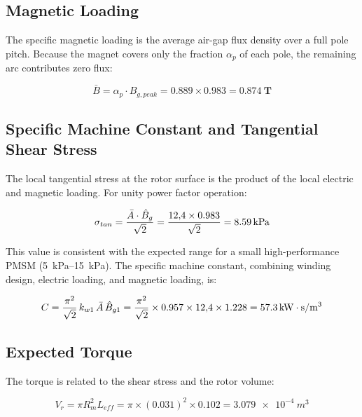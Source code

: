 \documentclass[12pt, a4paper]{article}
\begin{document}
\subsection{Magnetic Loading}

The specific magnetic loading is the average air-gap flux density over a
full pole pitch. Because the magnet covers only the fraction $\alpha_p$
of each pole, the remaining arc contributes zero flux:

\begin{equation}
    \bar{B} = \alpha_p \cdot B_{g,peak}
            = 0.889 \times 0.983
            = \mathbf{\SI{0.874}{T}}
\end{equation}

\subsection{Specific Machine Constant and Tangential Shear Stress}

The local tangential stress at the rotor surface is the product of the
local electric and magnetic loading. For unity power factor operation:

\begin{equation}
    \sigma_{tan} = \frac{\bar{A}\cdot\hat{B}_{g}}{\sqrt{2}}
                 = \frac{12{,}4 \times 0.983}{\sqrt{2}}
                 = \mathbf{\SI{8{,}59}{kPa}}
\end{equation}

This value is consistent with the expected range for a small
high-performance PMSM (\SIrange{5}{15}{kPa}). The specific machine
constant, combining winding design, electric loading, and magnetic
loading, is:

\begin{equation}
    C = \frac{\pi^2}{\sqrt{2}}\,k_{w1}\,\bar{A}\,\hat{B}_{g1}
      = \frac{\pi^2}{\sqrt{2}} \times 0.957 \times 12{,}4 \times 1.228
      = \mathbf{\SI{57{,}3}{kW\cdot s/m^3}}
\end{equation}

\subsection{Expected Torque}

The torque is related to the shear stress and the rotor volume:

\begin{equation}
    V_r = \pi R_m^2 L_{eff}
        = \pi \times (0.031)^2 \times 0.102
        = \SI{3.079e-4}{m^3}
\end{equation}
\end{document}
